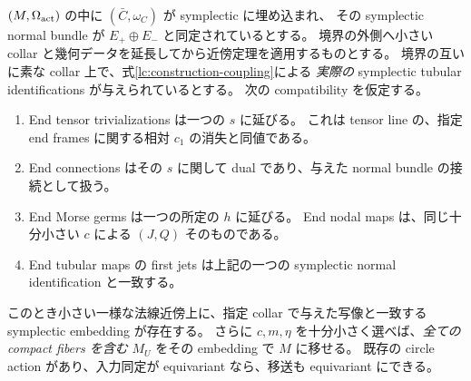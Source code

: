 \begin{proposition}\label{lc:construction-relative-moser}
$(M,\Omega_{\rm act})$ の中に $(\bar C,\omega_C)$ が symplectic に埋め込まれ、
その symplectic normal bundle が $E_+\oplus E_-$ と同定されているとする。
境界の外側へ小さい collar と幾何データを延長してから近傍定理を適用するものとする。
境界の互いに素な collar 上で、式\eqref{lc:construction-coupling}による
\emph{実際の} symplectic tubular identifications が与えられているとする。
次の compatibility を仮定する。
\begin{enumerate}
\item End tensor trivializations は一つの $s$ に延びる。
これは tensor line の、指定 end frames に関する相対 $c_1$ の消失と同値である。
\item End connections はその $s$ に関して dual であり、与えた normal bundle の接続として扱う。
\item End Morse germs は一つの所定の $h$ に延びる。
End nodal maps は、同じ十分小さい $c$ による $(J,Q)$ そのものである。
\item End tubular maps の first jets は上記の一つの symplectic normal identification と一致する。
\end{enumerate}
このとき小さい一様な法線近傍上に、指定 collar で与えた写像と一致する
symplectic embedding が存在する。
さらに $c,m,\eta$ を十分小さく選べば、\emph{全ての compact fibers を含む}
$M_U$ をその embedding で $M$ に移せる。
既存の circle action があり、入力同定が equivariant なら、移送も equivariant にできる。
\end{proposition}

